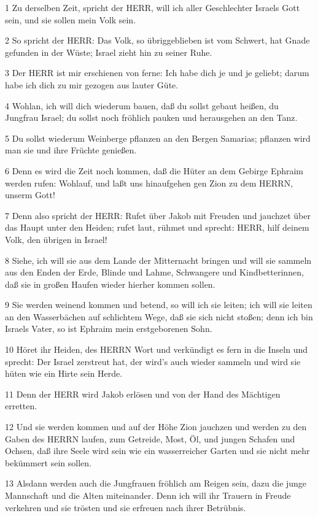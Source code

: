 \par 1 Zu derselben Zeit, spricht der HERR, will ich aller Geschlechter Israels Gott sein, und sie sollen mein Volk sein.
\par 2 So spricht der HERR: Das Volk, so übriggeblieben ist vom Schwert, hat Gnade gefunden in der Wüste; Israel zieht hin zu seiner Ruhe.
\par 3 Der HERR ist mir erschienen von ferne: Ich habe dich je und je geliebt; darum habe ich dich zu mir gezogen aus lauter Güte.
\par 4 Wohlan, ich will dich wiederum bauen, daß du sollst gebaut heißen, du Jungfrau Israel; du sollst noch fröhlich pauken und herausgehen an den Tanz.
\par 5 Du sollst wiederum Weinberge pflanzen an den Bergen Samarias; pflanzen wird man sie und ihre Früchte genießen.
\par 6 Denn es wird die Zeit noch kommen, daß die Hüter an dem Gebirge Ephraim werden rufen: Wohlauf, und laßt uns hinaufgehen gen Zion zu dem HERRN, unserm Gott!
\par 7 Denn also spricht der HERR: Rufet über Jakob mit Freuden und jauchzet über das Haupt unter den Heiden; rufet laut, rühmet und sprecht: HERR, hilf deinem Volk, den übrigen in Israel!
\par 8 Siehe, ich will sie aus dem Lande der Mitternacht bringen und will sie sammeln aus den Enden der Erde, Blinde und Lahme, Schwangere und Kindbetterinnen, daß sie in großen Haufen wieder hierher kommen sollen.
\par 9 Sie werden weinend kommen und betend, so will ich sie leiten; ich will sie leiten an den Wasserbächen auf schlichtem Wege, daß sie sich nicht stoßen; denn ich bin Israels Vater, so ist Ephraim mein erstgeborenen Sohn.
\par 10 Höret ihr Heiden, des HERRN Wort und verkündigt es fern in die Inseln und sprecht: Der Israel zerstreut hat, der wird's auch wieder sammeln und wird sie hüten wie ein Hirte sein Herde.
\par 11 Denn der HERR wird Jakob erlösen und von der Hand des Mächtigen erretten.
\par 12 Und sie werden kommen und auf der Höhe Zion jauchzen und werden zu den Gaben des HERRN laufen, zum Getreide, Most, Öl, und jungen Schafen und Ochsen, daß ihre Seele wird sein wie ein wasserreicher Garten und sie nicht mehr bekümmert sein sollen.
\par 13 Alsdann werden auch die Jungfrauen fröhlich am Reigen sein, dazu die junge Mannschaft und die Alten miteinander. Denn ich will ihr Trauern in Freude verkehren und sie trösten und sie erfreuen nach ihrer Betrübnis.
